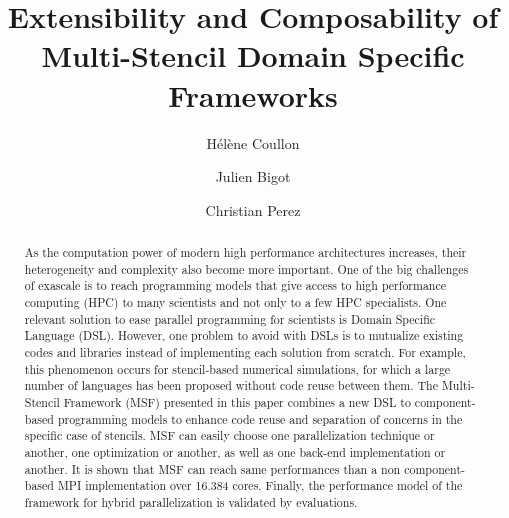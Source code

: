 \documentclass[smallextended]{svjour3}       %
\begin{document}

\title{Extensibility and Composability of Multi-Stencil Domain Specific Frameworks}
\author{H\'el\`ene Coullon \and Julien Bigot \and Christian Perez}
\maketitle
\begin{abstract}
As the computation power of modern high performance architectures increases, their heterogeneity and complexity also become more important. One of the big challenges of exascale is to reach programming models that give access to high performance computing (HPC) to many scientists and not only to a few HPC specialists. One relevant solution to ease parallel programming for scientists is Domain Specific Language (DSL). However, one problem to avoid with DSLs is to mutualize existing codes and libraries instead of implementing each solution from scratch. For example, this phenomenon occurs for stencil-based numerical simulations, for which a large number of languages has been proposed without code reuse between them. 
The Multi-Stencil Framework (MSF) presented in this paper combines a new DSL to component-based programming models to enhance code reuse and separation of concerns in the specific case of stencils. MSF can easily choose one parallelization technique or another, one optimization or another, as well as one back-end implementation or another. It is shown that MSF can reach same performances than a non component-based MPI implementation over 16.384 cores. Finally, the performance model of the framework for hybrid parallelization is validated by evaluations.

\end{abstract}
\end{document}
